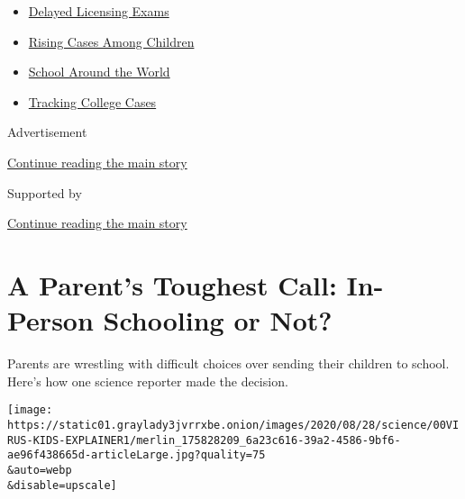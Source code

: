\begin{itemize}
\tightlist
\item
  \href{https://www.nytimes3xbfgragh.onion/2020/09/04/us/bar-exam-coronavirus.html?name=styln-coronavirus-schools-reopening\&region=TOP_BANNER\&block=storyline_menu_recirc\&action=click\&pgtype=Article\&impression_id=d5d66e40-f1c6-11ea-8605-93fb3e12e0cf\&variant=undefined}{Delayed
  Licensing Exams}
\item
  \href{https://www.nytimes3xbfgragh.onion/interactive/2020/08/31/us/coronavirus-cases-children.html?name=styln-coronavirus-schools-reopening\&region=TOP_BANNER\&block=storyline_menu_recirc\&action=click\&pgtype=Article\&impression_id=d5d66e41-f1c6-11ea-8605-93fb3e12e0cf\&variant=undefined}{Rising
  Cases Among Children}
\item
  \href{https://www.nytimes3xbfgragh.onion/2020/09/01/world/schools-reopen-globe-students.html?name=styln-coronavirus-schools-reopening\&region=TOP_BANNER\&block=storyline_menu_recirc\&action=click\&pgtype=Article\&impression_id=d5d66e42-f1c6-11ea-8605-93fb3e12e0cf\&variant=undefined}{School
  Around the World}
\item
  \href{https://www.nytimes3xbfgragh.onion/interactive/2020/us/covid-college-cases-tracker.html?name=styln-coronavirus-schools-reopening\&region=TOP_BANNER\&block=storyline_menu_recirc\&action=click\&pgtype=Article\&impression_id=d5d66e43-f1c6-11ea-8605-93fb3e12e0cf\&variant=undefined}{Tracking
  College Cases}
\end{itemize}

Advertisement

\protect\hyperlink{after-top}{Continue reading the main story}

Supported by

\protect\hyperlink{after-sponsor}{Continue reading the main story}

\hypertarget{a-parents-toughest-call-in-person-schooling-or-not}{%
\section{A Parent's Toughest Call: In-Person Schooling or
Not?}\label{a-parents-toughest-call-in-person-schooling-or-not}}

Parents are wrestling with difficult choices over sending their children
to school. Here's how one science reporter made the decision.

\texttt{[image: https://static01.graylady3jvrrxbe.onion/images/2020/08/28/science/00VIRUS-KIDS-EXPLAINER1/merlin\_175828209\_6a23c616-39a2-4586-9bf6-ae96f438665d-articleLarge.jpg?quality=75\\\&auto=webp\\\&disable=upscale]}

